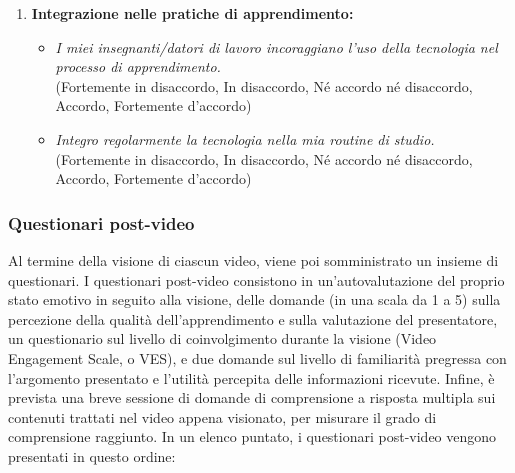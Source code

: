 \begin{enumerate}
    \item \textbf{Integrazione nelle pratiche di apprendimento:}
    \begin{itemize}
        \item \textit{I miei insegnanti/datori di lavoro incoraggiano l'uso della tecnologia nel processo di apprendimento.}\\
        (Fortemente in disaccordo, In disaccordo, Né accordo né disaccordo, Accordo, Fortemente d'accordo)
        \item \textit{Integro regolarmente la tecnologia nella mia routine di studio.}\\
        (Fortemente in disaccordo, In disaccordo, Né accordo né disaccordo, Accordo, Fortemente d'accordo)
    \end{itemize}
\end{enumerate}

\subsubsection{Questionari post-video}

Al termine della visione di ciascun video, viene poi somministrato un insieme di questionari. I questionari post-video consistono in un'autovalutazione del proprio stato emotivo in seguito alla visione, delle domande (in una scala da 1 a 5) sulla percezione della qualità dell'apprendimento e sulla valutazione del presentatore, un questionario sul livello di coinvolgimento durante la visione (Video Engagement Scale, o VES), e due domande sul livello di familiarità pregressa con l'argomento presentato e l'utilità percepita delle informazioni ricevute. Infine, è prevista una breve sessione di domande di comprensione a risposta multipla sui contenuti trattati nel video appena visionato, per misurare il grado di comprensione raggiunto. In un elenco puntato, i questionari post-video vengono presentati in questo ordine:

